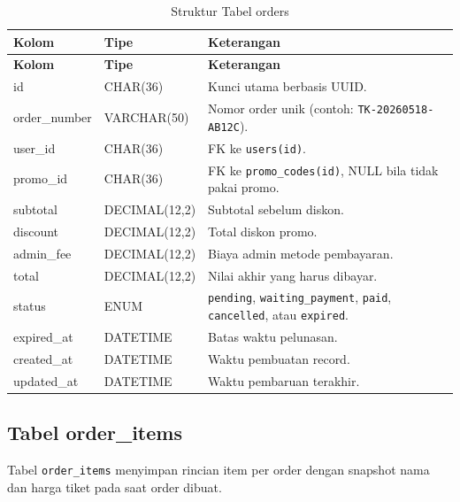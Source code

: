 \documentclass[12pt,a4paper]{report}
\begin{document}
\begin{longtable}{p{3.6cm} p{3.6cm} p{8.5cm}}
\caption{Struktur Tabel orders} \label{tab:orders} \\
\toprule
\textbf{Kolom} & \textbf{Tipe} & \textbf{Keterangan} \\
\midrule
\endfirsthead
\toprule
\textbf{Kolom} & \textbf{Tipe} & \textbf{Keterangan} \\
\midrule
\endhead
\bottomrule
\endfoot
id           & CHAR(36)      & Kunci utama berbasis UUID. \\
order\_number & VARCHAR(50)  & Nomor order unik (contoh: \texttt{TK-20260518-AB12C}). \\
user\_id     & CHAR(36)      & FK ke \texttt{users(id)}. \\
promo\_id    & CHAR(36)      & FK ke \texttt{promo\_codes(id)}, NULL bila tidak pakai promo. \\
subtotal     & DECIMAL(12,2) & Subtotal sebelum diskon. \\
discount     & DECIMAL(12,2) & Total diskon promo. \\
admin\_fee   & DECIMAL(12,2) & Biaya admin metode pembayaran. \\
total        & DECIMAL(12,2) & Nilai akhir yang harus dibayar. \\
status       & ENUM          & \texttt{pending}, \texttt{waiting\_payment}, \texttt{paid}, \texttt{cancelled}, atau \texttt{expired}. \\
expired\_at  & DATETIME      & Batas waktu pelunasan. \\
created\_at  & DATETIME      & Waktu pembuatan record. \\
updated\_at  & DATETIME      & Waktu pembaruan terakhir. \\
\end{longtable}

\subsection{Tabel order\_items}
Tabel \texttt{order\_items} menyimpan rincian item per order dengan snapshot nama dan harga tiket pada saat order dibuat.
\end{document}
